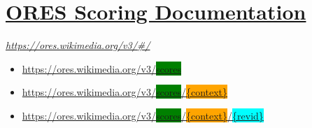 \documentclass[12pt,a4paper]{article}
\begin{document}
\section{\href{https://ores.wikimedia.org/v3/\#/}{ORES Scoring Documentation}}
\textit{\url{https://ores.wikimedia.org/v3/\#/}}
\begin{itemize}
\item \href{https://ores.wikimedia.org/v3/scores}{https://ores.wikimedia.org/v3/\colorbox{green}{scores}}
\item \href{https://ores.wikimedia.org/v3/scores/enwiki}{https://ores.wikimedia.org/v3/\colorbox{green}{scores}/\colorbox{orange}{\{context\}}}
\item \href{https://ores.wikimedia.org/v3/scores/enwiki/870259881}{https://ores.wikimedia.org/v3/\colorbox{green}{scores}/\colorbox{orange}{\{context\}}/\colorbox{cyan}{\{revid\}}}

\end{itemize}
\end{document}
